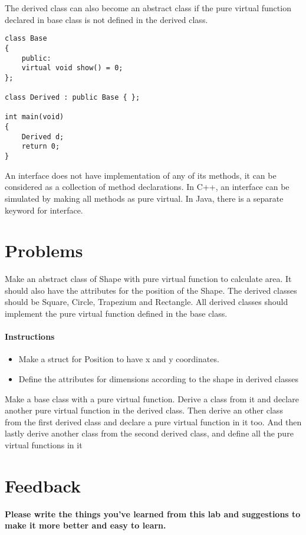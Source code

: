 \documentclass[11pt,fleqn]{book} %
\begin{document}
The derived class can also become an abstract class if the pure virtual function declared in base class is not defined in the derived class.
\begin{example}
\begin{lstlisting}
class Base
{
	public:
	virtual void show() = 0;
};

class Derived : public Base { };

int main(void)
{
	Derived d;
	return 0;
}
\end{lstlisting}
\end{example}
\begin{corollary}
An interface does not have implementation of any of its methods, it can be considered as a collection of method declarations. In C++, an interface can be simulated by making all methods as pure virtual. In Java, there is a separate keyword for interface.
\end{corollary}
\newpage
\section{Problems}
\begin{problem}
	Make an abstract class of Shape with pure virtual function to calculate area. It should also have the attributes for the position of the Shape. The derived classes should be Square, Circle, Trapezium and Rectangle. All derived classes should implement the pure virtual function defined in the base class. 
	\paragraph{Instructions}
	\begin{itemize}
		\item Make a struct for Position to have x and y coordinates.
		\item Define the attributes for dimensions according to the shape in derived classes
	\end{itemize}
\end{problem}
\begin{problem}
	Make a base class with a pure virtual function. Derive a class from it and declare another pure virtual function in the derived class. Then derive an other class from the first derived class and declare a pure virtual function in it too. And then lastly derive another class from the second derived class, and define all the pure virtual functions in it
\end{problem}
\newpage
\section{Feedback}
\textbf{Please write the things you've learned from this lab and suggestions to make it more better and easy to learn.}
\end{document}
